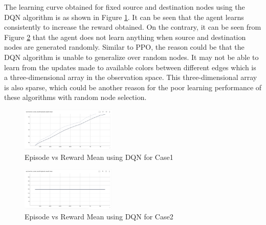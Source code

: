 \documentclass[conference]{IEEEtran}
\begin{document}
\vspace{0.5em}
The learning curve obtained for fixed source and destination nodes using the DQN algorithm is as shown in Figure \ref{fig:case1_dqn}. It can be seen that the agent learns consistently to increase the reward obtained. On the contrary, it can be seen from Figure \ref{fig:case2_dqn} that the agent does not learn anything when source and destination nodes are generated randomly. Similar to PPO, the reason could be that the DQN algorithm is unable to generalize over random nodes. It may not be able to learn from the updates made to available colors between different edges which is a three-dimensional array in the observation space. This three-dimensional array is also sparse, which could be another reason for the poor learning performance of these algorithms with random node selection.
\vspace{\baselineskip}
\begin{figure}[h]
    \centering
    \includegraphics[width=0.4\textwidth]{Figures/case1_dqn.png}
    \caption{Episode vs Reward Mean using DQN for Case1}
    \label{fig:case1_dqn}
\end{figure}

\vspace{\baselineskip}
\begin{figure}[h]
    \centering
    \includegraphics[width=0.4\textwidth]{Figures/case2_dqn.png}
    \caption{Episode vs Reward Mean using DQN for Case2}
    \label{fig:case2_dqn}
\end{figure}
\end{document}
